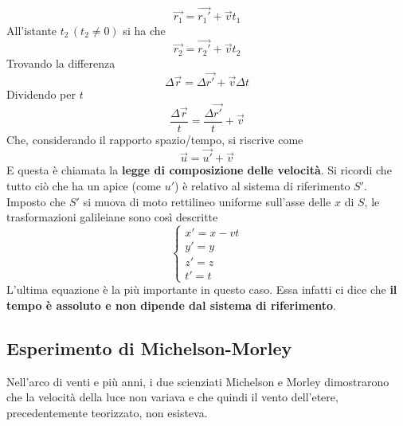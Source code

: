 \begin{equation*}
  \vec{r_1} = \vec{r_1'} + \vec{v}t_1
\end{equation*}
All'istante $t_2\,(t_2\neq0)$ si ha che
\begin{equation*}
  \vec{r_2} = \vec{r_2'} + \vec{v}t_2
\end{equation*}
Trovando la differenza
\begin{equation*}
  \Delta \vec{r} = \Delta\vec{r'}+\vec{v}\Delta t
\end{equation*}
Dividendo per $t$
\begin{equation*}
  \frac{\Delta\vec{r}}{t}=\frac{\Delta\vec{r'}}{t}+\vec{v}
\end{equation*}
Che, considerando il rapporto spazio/tempo, si riscrive come
\begin{equation*}
  \vec{u} = \vec{u'}+\vec{v}
\end{equation*}
E questa è chiamata la \textbf{legge di composizione delle velocità}. Si ricordi che tutto ciò che
ha un apice (come $u'$) è relativo al sistema di riferimento $S'$.\\ [\baselineskip]
Imposto che $S'$ si muova di moto rettilineo uniforme sull'asse delle $x$ di $S$, le trasformazioni
galileiane sono così descritte
\begin{equation*}
  \begin{cases}
    x' = x-vt\\
    y'=y\\
    z'=z\\
    t'=t
  \end{cases}
\end{equation*}
L'ultima equazione è la più importante in questo caso. Essa infatti ci dice che \textbf{il tempo è
assoluto e non dipende dal sistema di riferimento}. 

\subsection{Esperimento di Michelson-Morley}
Nell'arco di venti e più anni, i due scienziati Michelson e Morley dimostrarono che la velocità della
luce non variava e che quindi il vento dell'etere, precedentemente teorizzato, non esisteva.
